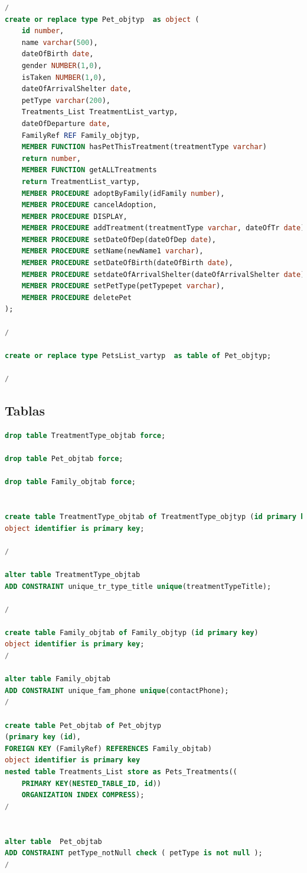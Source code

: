 \documentclass{FR16}
\begin{document}
\begin{lstlisting}[language=Sql, basicstyle=\scriptsize]
/
create or replace type Pet_objtyp  as object (
    id number,
    name varchar(500),
    dateOfBirth date,
    gender NUMBER(1,0),
    isTaken NUMBER(1,0),
    dateOfArrivalShelter date,
    petType varchar(200),
    Treatments_List TreatmentList_vartyp,
    dateOfDeparture date,
    FamilyRef REF Family_objtyp,
    MEMBER FUNCTION hasPetThisTreatment(treatmentType varchar)    
    return number,
    MEMBER FUNCTION getALLTreatments                              
    return TreatmentList_vartyp,
    MEMBER PROCEDURE adoptByFamily(idFamily number),
    MEMBER PROCEDURE cancelAdoption,
    MEMBER PROCEDURE DISPLAY,
    MEMBER PROCEDURE addTreatment(treatmentType varchar, dateOfTr date),
    MEMBER PROCEDURE setDateOfDep(dateOfDep date),
    MEMBER PROCEDURE setName(newName1 varchar),
    MEMBER PROCEDURE setDateOfBirth(dateOfBirth date),
    MEMBER PROCEDURE setdateOfArrivalShelter(dateOfArrivalShelter date),
    MEMBER PROCEDURE setPetType(petTypepet varchar),
    MEMBER PROCEDURE deletePet
);

/

create or replace type PetsList_vartyp  as table of Pet_objtyp;

/
\end{lstlisting}
\newpage

\subsection{Tablas}
\begin{lstlisting}[language=Sql, basicstyle=\scriptsize]
drop table TreatmentType_objtab force;

drop table Pet_objtab force;

drop table Family_objtab force;


create table TreatmentType_objtab of TreatmentType_objtyp (id primary key) 
object identifier is primary key;

/

alter table TreatmentType_objtab
ADD CONSTRAINT unique_tr_type_title unique(treatmentTypeTitle);

/

create table Family_objtab of Family_objtyp (id primary key) 
object identifier is primary key;
/

alter table Family_objtab
ADD CONSTRAINT unique_fam_phone unique(contactPhone);
/

create table Pet_objtab of Pet_objtyp 
(primary key (id),
FOREIGN KEY (FamilyRef) REFERENCES Family_objtab)
object identifier is primary key 
nested table Treatments_List store as Pets_Treatments((
    PRIMARY KEY(NESTED_TABLE_ID, id))
    ORGANIZATION INDEX COMPRESS);
/


alter table  Pet_objtab 
ADD CONSTRAINT petType_notNull check ( petType is not null );
/

\end{lstlisting}
\newpage
\end{document}

